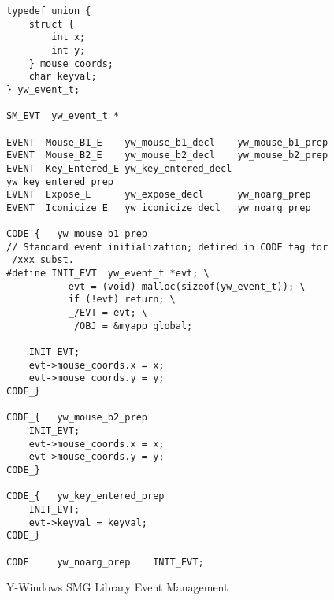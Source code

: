 \begin{figure*}[h]
\begin{verbatim}
typedef union {
    struct {
        int x;
        int y;
    } mouse_coords;
    char keyval;
} yw_event_t;

SM_EVT  yw_event_t *

EVENT  Mouse_B1_E    yw_mouse_b1_decl    yw_mouse_b1_prep
EVENT  Mouse_B2_E    yw_mouse_b2_decl    yw_mouse_b2_prep
EVENT  Key_Entered_E yw_key_entered_decl yw_key_entered_prep
EVENT  Expose_E      yw_expose_decl      yw_noarg_prep
EVENT  Iconicize_E   yw_iconicize_decl   yw_noarg_prep

CODE_{   yw_mouse_b1_prep
// Standard event initialization; defined in CODE tag for _/xxx subst.
#define INIT_EVT  yw_event_t *evt; \
           evt = (void) malloc(sizeof(yw_event_t)); \
           if (!evt) return; \
           _/EVT = evt; \
           _/OBJ = &myapp_global;

    INIT_EVT;
    evt->mouse_coords.x = x;
    evt->mouse_coords.y = y;
CODE_}

CODE_{   yw_mouse_b2_prep
    INIT_EVT;
    evt->mouse_coords.x = x;
    evt->mouse_coords.y = y;
CODE_}

CODE_{   yw_key_entered_prep
    INIT_EVT;
    evt->keyval = keyval;
CODE_}

CODE     yw_noarg_prep    INIT_EVT;
\end{verbatim}
\caption{Y-Windows SMG Library Event Management}\label{figure:y-w-lib-events}
\end{figure*}

